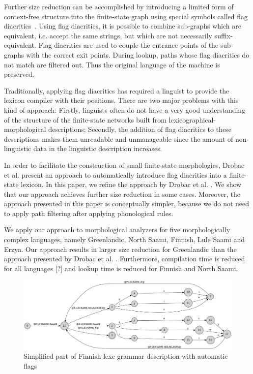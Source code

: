 \documentclass[11pt]{article}
\begin{document}
Further size reduction can be accomplished by introducing a limited
form of context-free structure into the finite-state graph using
special symbols called flag
diacritics~\cite{beesley1998constraining}. Using flag diacritics, it
is possible to combine sub-graphs which are equivalent, i.e. accept
the same strings, but which are not necessarily
suffix-equivalent. Flag diacritics are used to couple the entrance
points of the sub-graphs with the correct exit points. During lookup,
paths whose flag diacritics do not match are filtered out. Thus the
original language of the machine is preserved.

Traditionally, applying flag diacritics has required a linguist to
provide the lexicon compiler with their positions. There are two major
problems with this kind of approach: Firstly, linguists often do not
have a very good understanding of the structure of the finite-state
networks built from lexicographical-morphological descriptions;
Secondly, the addition of flag diacritics to these descriptions makes
them unreadable and unmanageable since the amount of non-linguistic
data in the linguistic description increases.

In order to facilitate the construction of small finite-state
morphologies, Drobac et al.  present an approach
to automatically introduce flag diacritics into a finite-state
lexicon. In this paper, we refine the approach by Drobac et
al. . We show that our approach achieves further
size reduction in some cases. Moreover, the approach presented in this
paper is conceptually simpler, because we do not need to apply path
filtering after applying phonological rules.

We apply our approach to morphological analyzers for five
morphologically complex languages, namely Greenlandic, North Saami,
Finnish, Lule Saami and Erzya. Our approach results in larger size
reduction for Greenlandic than the approach presented by Drobac et
al. . Furthermore, compilation time is reduced
for all languages [?] and lookup time is reduced for Finnish and North
Saami.

\begin{figure}[!htb]
    \includegraphics[width=\textwidth]{transducer.png}
     \caption{Simplified part of Finnish lexc grammar description with automatic flags
     \label{fig:lexc-fin-flag}}
\end{figure}
\end{document}
